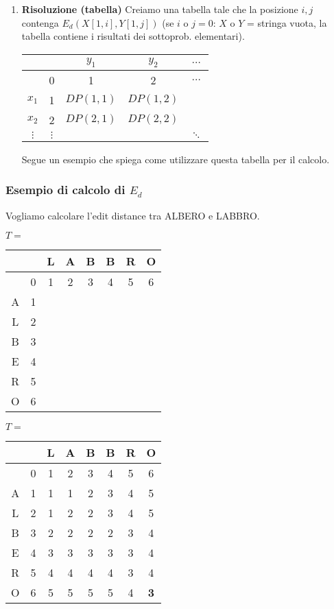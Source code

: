 \documentclass[a4paper,10pt]{article}
\theoremstyle{definition}
\begin{document}
\begin{enumerate}
\item \textbf{Risoluzione (tabella)}
Creiamo una tabella tale che la posizione $i, j$ contenga $E_d(X[1, i], Y[1, j])$ (se $i$ o $j = 0$: $X$ o $Y$ = stringa vuota, la tabella contiene i risultati dei sottoprob. elementari).
\begin{center}
\begin{tabular}{|c|c c c c|}
\hline
  & & $y_1$ & $y_2$ & $\hdots$\\
  \hline
  & 0 & 1 & 2 & $\hdots$\\
 $x_1$ &1& $DP(1, 1)$ & $DP(1, 2)$&\\
 $x_2$ &2 & $DP(2, 1)$ & $DP(2, 2)$ & \\
 $\vdots$ &$\vdots$ & & & $\ddots$ \\
 \hline
\end{tabular}

\end{center}
Segue un esempio che spiega come utilizzare questa tabella per il calcolo.
 \end{enumerate}

 \newpage
 \subsubsection{Esempio di calcolo di $E_d$}
 Vogliamo calcolare l'edit distance tra ALBERO e LABBRO. 
 \begin{multicols}{2}
  
 \begin{center} $T = $
\begin{tabular}{|c|c c c c c c c|}
\hline
  & & L & A & B & B & R & O\\
  \hline
  & 0 & 1 & 2 & 3& 4& 5& 6\\
 A &1&  & & & & & \\
 L &2 &  & & & & & \\
 B &3 &  & & & & & \\
 E &4 &  & & & & & \\
 R &5 &  & & & & & \\
 O &6 &  & & & & & \\
 \hline
\end{tabular}

\end{center}
 \begin{center} $T = $
\begin{tabular}{|c|c c c c c c c|}
\hline
  & & L & A & B & B & R & O\\
  \hline
  & 0 & 1 & 2 & 3 & 4 & 5 & 6\\
 A &1 & 1 & 1 & 2 & 3 & 4 & 5 \\
 L &2 & 1 & 2 & 2 & 3 & 4 & 5\\
 B &3 & 2 & 2 & 2 & 2 & 3 & 4\\
 E &4 & 3 & 3 & 3 & 3 & 3 & 4\\
 R &5 & 4 & 4 & 4 & 4 & 3 & 4\\
 O &6 & 5 & 5 & 5 & 5 & 4 & \textbf{3}\\
 \hline
\end{tabular}

\end{center}

 \end{multicols}
\end{document}

